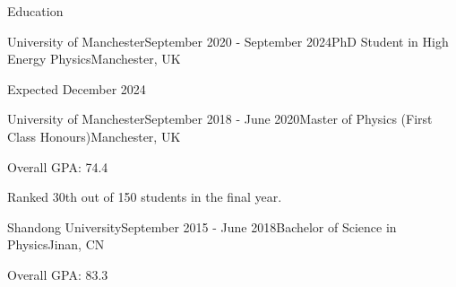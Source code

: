 \documentclass{resume} %
\begin{document}
    \begin{rSection}{Education}
        \begin{rSubsection}{University of Manchester}{September 2020 - September 2024}{PhD Student in High Energy Physics}{Manchester, UK}
            \item Expected December 2024 
        \end{rSubsection}
        \begin{rSubsection}{University of Manchester}{September 2018 - June 2020}{Master of Physics (First Class Honours)}{Manchester, UK}
            \item Overall GPA: 74.4
            \item Ranked 30th out of 150 students in the final year.
        \end{rSubsection}
        \begin{rSubsection}{Shandong University}{September 2015 - June 2018}{Bachelor of Science in Physics}{Jinan, CN}
            \item Overall GPA: 83.3
        \end{rSubsection}
    \end{rSection}
\end{document}
